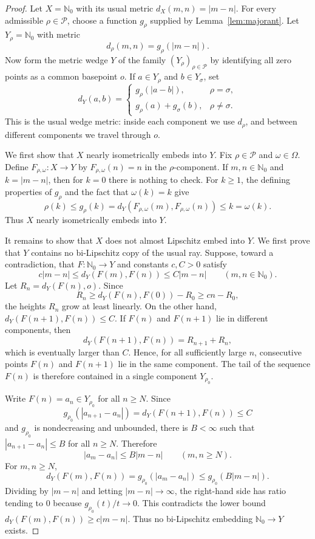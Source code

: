 \documentclass[11pt]{article}
\newcommand{\Nzero}{\mathbb N_0}
\newcommand{\rhoF}{\mathcal P}
\newcommand{\omegaF}{\Omega}
\begin{document}
\begin{proof}
Let \(X=\Nzero\) with its usual metric \(d_X(m,n)=|m-n|\).
For every admissible \(\rho\in\rhoF\), choose a function \(g_\rho\) supplied by
Lemma~\ref{lem:majorant}.  Let \(Y_\rho=\Nzero\) with metric
\[
d_\rho(m,n)=g_\rho(|m-n|).
\]
Now form the metric wedge \(Y\) of the family \((Y_\rho)_{\rho\in\rhoF}\) by
identifying all zero points as a common basepoint \(o\).  If \(a\in Y_\rho\)
and \(b\in Y_\sigma\), set
\[
d_Y(a,b)=
\begin{cases}
g_\rho(|a-b|),& \rho=\sigma,\\
g_\rho(a)+g_\sigma(b),& \rho\ne\sigma.
\end{cases}
\]
This is the usual wedge metric: inside each component we use \(d_\rho\), and
between different components we travel through \(o\).

We first show that \(X\) nearly isometrically embeds into \(Y\).  Fix
\(\rho\in\rhoF\) and \(\omega\in\omegaF\).  Define \(F_{\rho,\omega}:X\to Y\)
by \(F_{\rho,\omega}(n)=n\) in the \(\rho\)-component.  If \(m,n\in\Nzero\)
and \(k=|m-n|\), then for \(k=0\) there is nothing to check.  For \(k\ge1\),
the defining properties of \(g_\rho\) and the fact that \(\omega(k)=k\) give
\[
\rho(k)\le g_\rho(k)
=d_Y(F_{\rho,\omega}(m),F_{\rho,\omega}(n))
\le k=\omega(k).
\]
Thus \(X\) nearly isometrically embeds into \(Y\).

It remains to show that \(X\) does not almost Lipschitz embed into \(Y\).
We first prove that \(Y\) contains no bi-Lipschitz copy of the usual ray.
Suppose, toward a contradiction, that \(F:\Nzero\to Y\) and constants
\(c,C>0\) satisfy
\[
c|m-n|\le d_Y(F(m),F(n))\le C|m-n|
\qquad(m,n\in\Nzero).
\]
Let \(R_n=d_Y(F(n),o)\).  Since
\[
R_n\ge d_Y(F(n),F(0))-R_0\ge cn-R_0,
\]
the heights \(R_n\) grow at least linearly.  On the other hand,
\(d_Y(F(n+1),F(n))\le C\).  If \(F(n)\) and \(F(n+1)\) lie in different
components, then
\[
d_Y(F(n+1),F(n))=R_{n+1}+R_n,
\]
which is eventually larger than \(C\).  Hence, for all sufficiently large
\(n\), consecutive points \(F(n)\) and \(F(n+1)\) lie in the same component.
The tail of the sequence \(F(n)\) is therefore contained in a single
component \(Y_{\rho_0}\).

Write \(F(n)=a_n\in Y_{\rho_0}\) for all \(n\ge N\).  Since
\[
g_{\rho_0}(|a_{n+1}-a_n|)=d_Y(F(n+1),F(n))\le C
\]
and \(g_{\rho_0}\) is nondecreasing and unbounded, there is \(B<\infty\) such
that \(|a_{n+1}-a_n|\le B\) for all \(n\ge N\).  Therefore
\[
|a_m-a_n|\le B|m-n| \qquad(m,n\ge N).
\]
For \(m,n\ge N\),
\[
d_Y(F(m),F(n))=g_{\rho_0}(|a_m-a_n|)
\le g_{\rho_0}(B|m-n|).
\]
Dividing by \(|m-n|\) and letting \(|m-n|\to\infty\), the right-hand side has
ratio tending to \(0\) because \(g_{\rho_0}(t)/t\to0\).  This contradicts the
lower bound \(d_Y(F(m),F(n))\ge c|m-n|\).  Thus no bi-Lipschitz embedding
\(\Nzero\to Y\) exists.


\end{proof}
\end{document}
